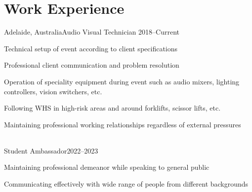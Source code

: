 \section{Work Experience}
	{Adelaide, Australia}{Audio Visual Technician}
	{2018--Current}{
    \item[\textbf{--}] Technical setup of event according to client specifications
    \item[\textbf{--}] Professional client communication and problem resolution
    \item[\textbf{--}] Operation of speciality equipment during event
    	such as audio mixers, lighting controllers, vision switchers, etc.
    \item[\textbf{--}] Following WHS in high-risk areas and around forklifts,
    	scissor lifts, etc.
    \item[\textbf{--}] Maintaining professional working relationships regardless of external pressures
}\vspace{0.1cm}
\\
	{Student Ambassador}{2022--2023}{
    \item[\textbf{--}] Maintaining professional demeanor while speaking to general public
    \item[\textbf{--}] Communicating effectively with wide range of people from different backgrounds
}
